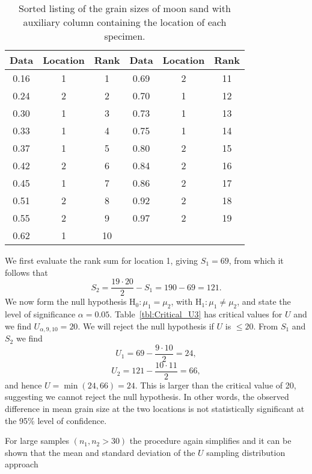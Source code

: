 \begin{example}
\begin{table}[h]
\centering
\begin{tabular}{|c|c|c||c|c|c|} \hline
\bf{Data} & \bf{Location} & \bf{Rank} & \bf{Data} & \bf{Location} & \bf{Rank}\\ \hline
0.16 & 1 & 1  & 0.69 & 2 & 11 \\ \hline
0.24 & 2 & 2  & 0.70 & 1 & 12 \\ \hline
0.30 & 1 & 3  & 0.73 & 1 & 13 \\ \hline
0.33 & 1 & 4  & 0.75 & 1 & 14 \\ \hline
0.37 & 1 & 5  & 0.80 & 2 & 15 \\ \hline
0.42 & 2 & 6  & 0.84 & 2 & 16 \\ \hline
0.45 & 1 & 7  & 0.86 & 2 & 17 \\ \hline
0.51 & 2 & 8  & 0.92 & 2 & 18 \\ \hline
0.55 & 2 & 9  & 0.97 & 2 & 19 \\ \hline
0.62 & 1 & 10 &      &   &    \\ \hline
\end{tabular}
\caption{Sorted listing of the grain sizes of moon sand with auxiliary column containing the location of each specimen.}
\label{tbl:moonsand}
\end{table}
We first evaluate the rank sum for location 1, giving $S_1 = 69$, from which it follows that
\begin{equation}
S_2 = \frac{19 \cdot 20}{2} - S_1 = 190 - 69 = 121.
\end{equation}	 
We now form the null hypothesis H$_0: \mu_1 = \mu_2$, with H$_1: \mu_1 \neq \mu_2$, and state the level of 
significance $\alpha = 0.05$.  Table~\ref{tbl:Critical_U3} has critical values for $U$ and we find $U_{\alpha, 9, 10} = 20$.  We will 
reject the null hypothesis if $U$ is $\leq 20$.  From $S_1$ and $S_2$ we find 
\begin{equation}
U_1 = 69 - \frac{9\cdot 10}{2} = 24,
\end{equation}	  
\begin{equation}
U_2 = 121 - \frac{10 \cdot 11}{2} = 66,
\end{equation}
and hence $U = \min(24, 66) = 24$.  This is larger than the critical value of 20, suggesting we 
cannot reject the null hypothesis.  In other words, the observed difference in mean grain size at the two locations is 
not statistically significant at the 95\% level of confidence.
\end{example}
	For large samples $(n_1, n_2 > 30)$ the procedure again simplifies and it can be shown that the mean and 
standard deviation of the $U$ sampling distribution approach

